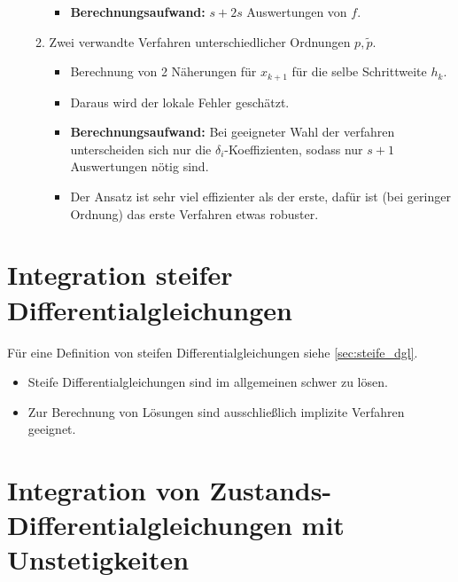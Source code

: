 \documentclass[a4paper, 11pt, accentcolor = tud3b]{tudreport}
\begin{document}
\begin{itemize}
\begin{enumerate}
\begin{itemize}
									\item \textbf{Berechnungsaufwand:} \( s + 2s \) Auswertungen von \( f \).
								\end{itemize}
							\item Zwei verwandte Verfahren unterschiedlicher Ordnungen \( p, \tilde{p} \).
								\begin{itemize}
									\item Berechnung von 2 Näherungen für \( x _ { k + 1 } \) für die selbe Schrittweite \( h _ k \).
									\item Daraus wird der lokale Fehler geschätzt.
									\item \textbf{Berechnungsaufwand:} Bei geeigneter Wahl der verfahren unterscheiden sich nur die \( \delta _ i \)-Koeffizienten, sodass nur \( s + 1 \) Auswertungen nötig sind.
									\item Der Ansatz ist sehr viel effizienter als der erste, dafür ist (bei geringer Ordnung) das erste Verfahren etwas robuster.
								\end{itemize}
						\end{enumerate}
	            \end{itemize}

        \section{Integration steifer Differentialgleichungen} %
            Für eine Definition von steifen Differentialgleichungen siehe \ref{sec:steife_dgl}.
            
            \begin{itemize}
            	\item Steife Differentialgleichungen sind im allgemeinen schwer zu lösen.
            	\item Zur Berechnung von Lösungen sind ausschließlich implizite Verfahren geeignet.
            \end{itemize}

        \section{Integration von Zustands-Differentialgleichungen mit Unstetigkeiten} %
	        \label{sec:integration_unstetig}
	        
        
\end{document}
